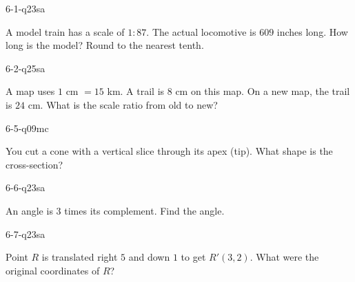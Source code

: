 \begin{practiceQuestion}{6-1-q23}{sa}
\begin{questionText}
A model train has a scale of $1:87$. The actual locomotive is $609$ inches long. How long is the model? Round to the nearest tenth.
\end{questionText}
\end{practiceQuestion}

\begin{practiceQuestion}{6-2-q25}{sa}
\begin{questionText}
A map uses $1$ cm $= 15$ km. A trail is $8$ cm on this map. On a new map, the trail is $24$ cm. What is the scale ratio from old to new?
\end{questionText}
\end{practiceQuestion}

\begin{practiceQuestion}{6-5-q09}{mc}
\begin{questionText}
You cut a cone with a vertical slice through its apex (tip). What shape is the cross-section?
\end{questionText}
\end{practiceQuestion}

\begin{practiceQuestion}{6-6-q23}{sa}
\begin{questionText}
An angle is $3$ times its complement. Find the angle.
\end{questionText}
\end{practiceQuestion}

\begin{practiceQuestion}{6-7-q23}{sa}
\begin{questionText}
Point $R$ is translated right $5$ and down $1$ to get $R'(3, 2)$. What were the original coordinates of $R$?
\end{questionText}
\end{practiceQuestion}

